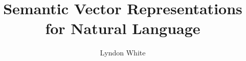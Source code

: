 \documentclass[12pt,landscape,english]{beamer}
\begin{document}
	

\title[Semantic Vector Representations]{Semantic Vector Representations for Natural Language}
\author[L.~White]{
	Lyndon White \texorpdfstring{\\}{}}

\date{} %
{
\begin{frame}[plain]
	\titlepage
\end{frame}
}


\def\x{\tilde{x}}
\def\y{\tilde{y}}
\def\b{\tilde{b}}


\end{document}

